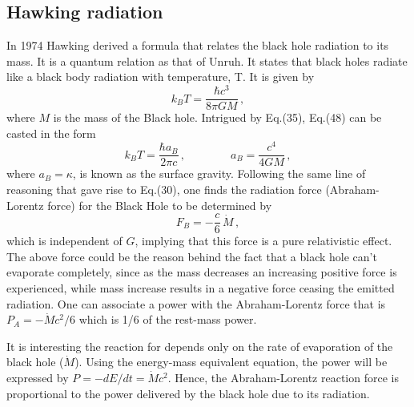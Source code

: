 \documentclass[a4]{epl2}
\begin{document}
\subsection{\textcolor[rgb]{0.00,0.07,1.00}{Hawking radiation}}

In 1974 Hawking  derived a formula that relates the black hole radiation to its mass. It is a quantum relation as that of Unruh. It states that black holes radiate like a black body radiation with temperature, T. It is given by \textcolor[rgb]{0.00,0.07,1.00}{\cite{hawking}}
\begin{equation}
k_BT=\frac{\hbar c^3}{8\pi GM}\,,
\end{equation}
where $M$ is the mass of the Black hole. Intrigued by Eq.(35), Eq.(48) can be casted in the form
\begin{equation}
k_BT=\frac{\hbar a_B}{2\pi c}\,,\qquad\qquad a_B=\frac{c^4}{4 G M}\,,
\end{equation}
where $a_B=\kappa$, is known as the surface gravity. Following the same line of reasoning that gave rise to Eq.(30), one finds the radiation force (Abraham-Lorentz force) for the Black Hole to be determined by
\begin{equation}
F_B=-\frac{c}{6}\, \dot M\,,
\end{equation}
which is independent of $G$, implying that this force is a pure relativistic effect. The above force could be the reason behind the fact that a black hole can't evaporate completely, since as the mass decreases an increasing positive force is experienced, while mass increase results in a negative force ceasing the emitted radiation. One can associate a power with the Abraham-Lorentz force that is $P_A=-\dot M c^2/6$ which is 1/6 of the rest-mass power.

It is interesting the reaction for depends only on the rate of evaporation of the black hole ($\dot M$). Using the energy-mass equivalent equation, the power will be expressed by $P=-dE/dt=\dot Mc^2$. Hence, the Abraham-Lorentz reaction force is proportional to the power delivered by the black hole due to its radiation.
\end{document}
